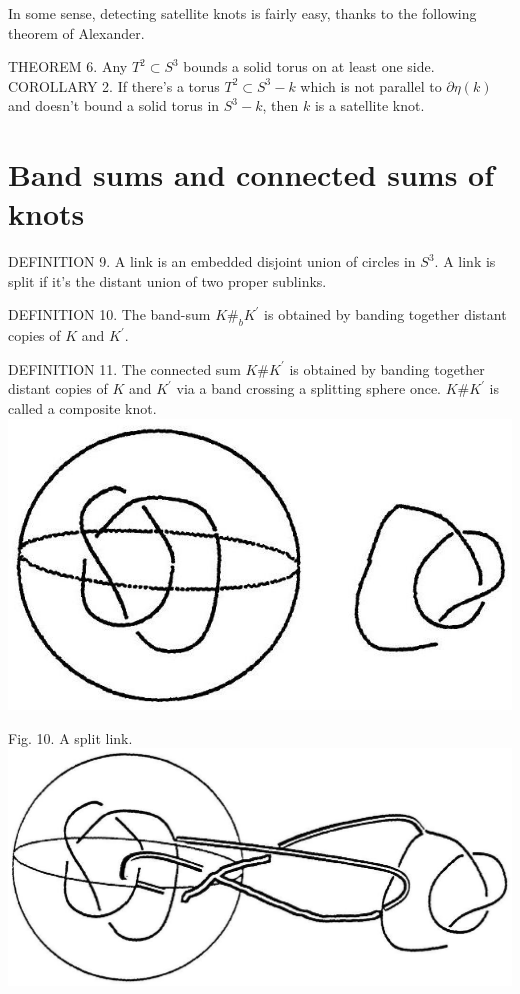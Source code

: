 \documentclass[10pt, letterpaper]{article}
\begin{document}
In some sense, detecting satellite knots is fairly easy, thanks to the following theorem of Alexander.

THEOREM 6. Any $T^{2} \subset S^{3}$ bounds a solid torus on at least one side.\\
COROLLARY 2. If there's a torus $T^{2} \subset S^{3}-k$ which is not parallel to $\partial \eta(k)$ and doesn't bound a solid torus in $S^{3}-k$, then $k$ is a satellite knot.



\section{Band sums and connected sums of knots}

DEFINITION 9. A link is an embedded disjoint union of circles in $S^{3}$. A link is split if it's the distant union of two proper sublinks.

DEFINITION 10. The band-sum $K \#_{b} K^{\prime}$ is obtained by banding together distant copies of $K$ and $K^{\prime}$.

DEFINITION 11. The connected sum $K \# K^{\prime}$ is obtained by banding together distant copies of $K$ and $K^{\prime}$ via a band crossing a splitting sphere once. $K \# K^{\prime}$ is called a composite knot.\\
\includegraphics[scale=0.2, center]{2025_05_21_037de704f595ce642d3eg-083(1)}

Fig. 10. A split link.\\
\includegraphics[scale=0.2, center]{2025_05_21_037de704f595ce642d3eg-083(2)}
\end{document}
